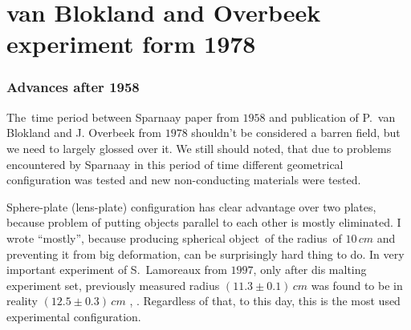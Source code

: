 \documentclass[10pt,t]{beamer}
\begin{document}
\section{van Blokland and Overbeek experiment form 1978}



\begin{frame}
  \frametitle{Advances after 1958}


  The~time period between Sparnaay paper from $1958$ and publication of
  P.~van Blokland and J. Overbeek from $1978$ shouldn't be considered a
  barren field, but we need to largely glossed over it. We still should
  noted, that due to problems encountered by Sparnaay in this period of time
  different geometrical configuration was tested and new non-conducting
  materials were tested.

  Sphere-plate (lens-plate) configuration has clear advantage over two
  plates, because problem of putting objects parallel to each other is
  mostly eliminated. I wrote ``mostly'', because producing spherical
  object~of the radius~of $10 \, \si{cm}$ and preventing it from big
  deformation, can be surprisingly hard thing to do. In very important
  experiment of S.~Lamoreaux from $1997$, only after dis malting experiment
  set, previously measured radius $( 11.3 \pm 0.1 ) \, \si{cm}$ was found to
  be in reality $( 12.5 \pm 0.3 ) \, \si{cm}$
  \parencite{Lamoreaux-Demonstration-of-the-Casimir-Force-ETC-Pub-1997},
  \parencite{Lamoreaux-Erratum-Demonstration-of-the-Casimir-ETC-Pub-1998}.
  Regardless of that, to this day, this is the most used experimental
  configuration.

\end{frame}
\end{document}
